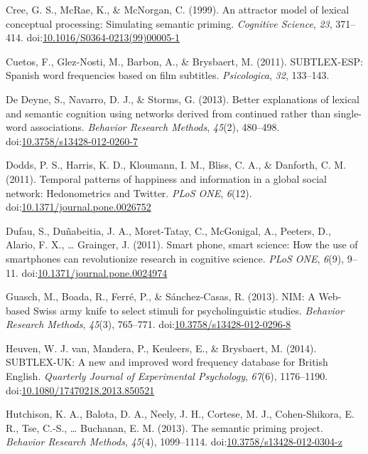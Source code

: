 \documentclass[english,man]{apa6}
\theoremstyle{definition}
\theoremstyle{definition}
\theoremstyle{definition}
\theoremstyle{remark}
\begin{document}
\hypertarget{ref-Cree1999}{}
Cree, G. S., McRae, K., \& McNorgan, C. (1999). An attractor model of
lexical conceptual processing: Simulating semantic priming.
\emph{Cognitive Science}, \emph{23}, 371--414.
doi:\href{https://doi.org/10.1016/S0364-0213(99)00005-1}{10.1016/S0364-0213(99)00005-1}

\hypertarget{ref-Cuetos2011}{}
Cuetos, F., Glez-Nosti, M., Barbon, A., \& Brysbaert, M. (2011).
SUBTLEX-ESP: Spanish word frequencies based on film subtitles.
\emph{Psicologica}, \emph{32}, 133--143.

\hypertarget{ref-DeDeyne2013}{}
De Deyne, S., Navarro, D. J., \& Storms, G. (2013). Better explanations
of lexical and semantic cognition using networks derived from continued
rather than single-word associations. \emph{Behavior Research Methods},
\emph{45}(2), 480--498.
doi:\href{https://doi.org/10.3758/s13428-012-0260-7}{10.3758/s13428-012-0260-7}

\hypertarget{ref-Dodds2011}{}
Dodds, P. S., Harris, K. D., Kloumann, I. M., Bliss, C. A., \& Danforth,
C. M. (2011). Temporal patterns of happiness and information in a global
social network: Hedonometrics and Twitter. \emph{PLoS ONE},
\emph{6}(12).
doi:\href{https://doi.org/10.1371/journal.pone.0026752}{10.1371/journal.pone.0026752}

\hypertarget{ref-Dufau2011}{}
Dufau, S., Duñabeitia, J. A., Moret-Tatay, C., McGonigal, A., Peeters,
D., Alario, F. X., \ldots{} Grainger, J. (2011). Smart phone, smart
science: How the use of smartphones can revolutionize research in
cognitive science. \emph{PLoS ONE}, \emph{6}(9), 9--11.
doi:\href{https://doi.org/10.1371/journal.pone.0024974}{10.1371/journal.pone.0024974}

\hypertarget{ref-Guasch2013}{}
Guasch, M., Boada, R., Ferré, P., \& Sánchez-Casas, R. (2013). NIM: A
Web-based Swiss army knife to select stimuli for psycholinguistic
studies. \emph{Behavior Research Methods}, \emph{45}(3), 765--771.
doi:\href{https://doi.org/10.3758/s13428-012-0296-8}{10.3758/s13428-012-0296-8}

\hypertarget{ref-VanHeuven2014}{}
Heuven, W. J. van, Mandera, P., Keuleers, E., \& Brysbaert, M. (2014).
SUBTLEX-UK: A new and improved word frequency database for British
English. \emph{Quarterly Journal of Experimental Psychology},
\emph{67}(6), 1176--1190.
doi:\href{https://doi.org/10.1080/17470218.2013.850521}{10.1080/17470218.2013.850521}

\hypertarget{ref-Hutchison2013}{}
Hutchison, K. A., Balota, D. A., Neely, J. H., Cortese, M. J.,
Cohen-Shikora, E. R., Tse, C.-S., \ldots{} Buchanan, E. M. (2013). The
semantic priming project. \emph{Behavior Research Methods},
\emph{45}(4), 1099--1114.
doi:\href{https://doi.org/10.3758/s13428-012-0304-z}{10.3758/s13428-012-0304-z}
\end{document}
